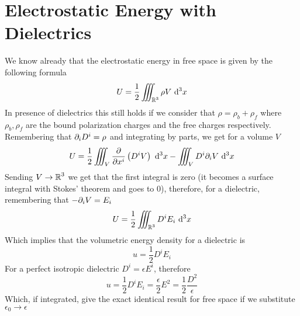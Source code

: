 \documentclass[../electromagnetism]{subfiles}
\begin{document}
\section{Electrostatic Energy with Dielectrics}
We know already that the electrostatic energy in free space is given by the following formula
\begin{equation*}
	U=\frac{1}{2}\iiint_{\operatorname{\mathbb{R}}^3}\rho V\ \mathrm{d}^3x
\end{equation*}
In presence of dielectrics this still holds if we consider that $\rho=\rho_b+\rho_f$ where $\rho_b,\rho_f$ are the bound polarization charges and the free charges respectively.\\
Remembering that $\partial_iD^i=\rho$ and integrating by parts, we get for a volume $V$
\begin{equation}
	U=\frac{1}{2}\iiint_V\pdv{x^i}\left( D^iV \right)\ \mathrm{d}^3x-\iiint_VD^i\partial_iV\ \mathrm{d}^3x
	\label{eq:dieen1}
\end{equation}
Sending $V\to\operatorname{\mathbb{R}}^3$ we get that the first integral is zero (it becomes a surface integral with Stokes' theorem and goes to 0), therefore, for a dielectric, remembering that $-\partial_iV=E_i$
\begin{equation}
	U=\frac{1}{2}\iiint_{\operatorname{\mathbb{R}}^3}D^iE_i\ \mathrm{d}^3x
	\label{eq:energydie}
\end{equation}
Which implies that the volumetric energy density for a dielectric is
\begin{equation}
	u=\frac{1}{2}D^iE_i
	\label{eq:endendie}
\end{equation}
For a perfect isotropic dielectric $D^i=\epsilon E^i$, therefore
\begin{equation}
	u=\frac{1}{2}D^iE_i=\frac{\epsilon}{2}E^2=\frac{1}{2}\frac{D^2}{\epsilon}
	\label{eq:perfectisodieenden}
\end{equation}
Which, if integrated, give the exact identical result for free space if we substitute $\epsilon_0\to\epsilon$
\end{document}

